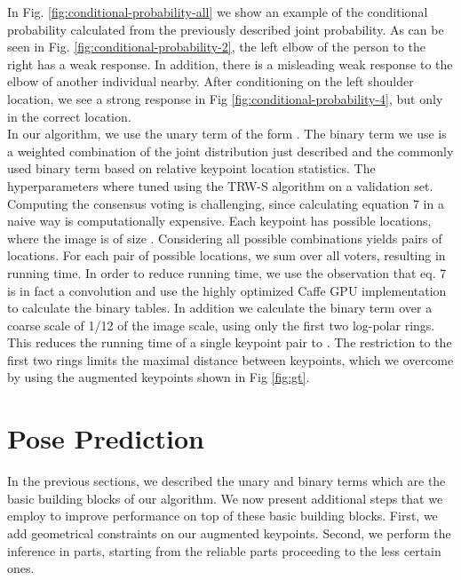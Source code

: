 \documentclass{article}
\begin{document}
In Fig. \ref{fig:conditional-probability-all} we show an example of the conditional probability  calculated from the previously described joint probability. As can be seen in Fig. \ref{fig:conditional-probability-2}, the left elbow of the  person to the right has a weak response. In addition, there is a misleading weak response to the elbow of another individual nearby. After conditioning on the left shoulder location, we see  a strong response in Fig \ref{fig:conditional-probability-4}, but only in the correct location.\\


In our algorithm, we use the unary term of the form . The binary term  we use is a weighted combination of the joint distribution  just described and the commonly used binary term based on relative keypoint location statistics. The hyperparameters where tuned using the TRW-S algorithm \cite{Kolmogorov06} on a validation set.\\

Computing the consensus voting is challenging, since calculating equation 7 in a naive way is computationally expensive. Each keypoint has  possible locations, where the image is of size . Considering all possible combinations yields  pairs of locations. For each pair of possible locations, we sum over all  voters, resulting in  running time. In order to reduce running time, we use the observation that eq. 7 is in fact a convolution and use the highly optimized Caffe GPU implementation \cite{jia2014} to calculate the binary tables. In addition we calculate the binary term over a coarse scale of 1/12 of the image scale, using only the first two log-polar rings. This reduces the running time of a single keypoint pair to .   The restriction to the first two rings limits the maximal distance between keypoints, which we overcome by using the augmented keypoints shown in Fig \ref{fig:gt}. 


\section{Pose Prediction}\label{sec:pose-prediction}

In the previous sections, we described the unary and binary terms which are the basic building blocks of our algorithm. We now present additional steps  that we employ  to improve performance on top of these basic building blocks. First, we add geometrical constraints on our augmented keypoints. Second, we perform the inference in parts, starting from the reliable parts proceeding to the less certain ones.
\end{document}
